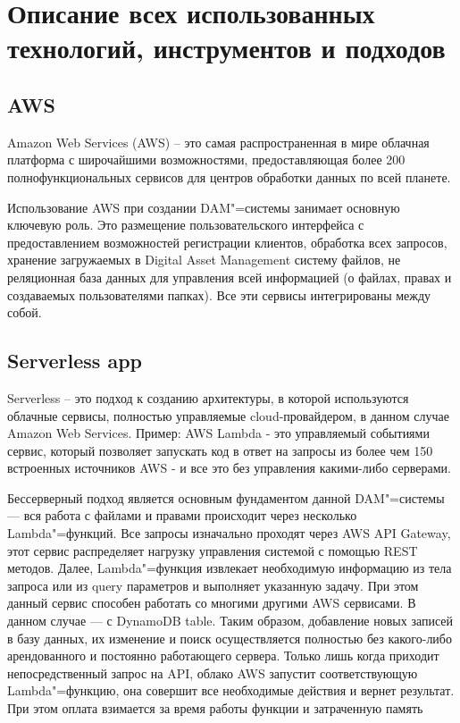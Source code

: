 
\section{Описание всех использованных технологий, инструментов и подходов}

\subsection{AWS}
Amazon Web Services (AWS) – это самая распространенная в мире облачная платформа с широчайшими возможностями, предоставляющая более 200 полнофункциональных сервисов для центров обработки данных по всей планете.

Использование AWS при создании DAM"=системы занимает основную ключевую роль. Это размещение пользовательского интерфейса с предоставлением возможностей регистрации клиентов, обработка всех запросов, хранение загружаемых в Digital Asset Management систему файлов, не реляционная база данных для управления всей информацией (о файлах, правах и создаваемых пользователями папках). Все эти сервисы интегрированы между собой.

\subsection{Serverless app}
Serverless – это подход к созданию архитектуры, в которой используются облачные сервисы, полностью управляемые cloud-провайдером, в данном случае Amazon Web Services. 
 Пример: AWS Lambda - это управляемый событиями сервис, который позволяет запускать код в ответ на запросы из более чем 150 встроенных источников AWS - и все это без управления какими-либо серверами.

Бессерверный подход является основным фундаментом данной DAM"=системы --- вся работа с файлами и правами происходит через несколько Lambda"=функций.
Все запросы изначально проходят через AWS API Gateway, этот сервис распределяет нагрузку управления системой с помощью REST методов.
Далее, Lambda"=функция извлекает необходимую информацию из тела запроса или из query параметров и выполняет указанную задачу.
При этом данный сервис способен работать со многими другими AWS сервисами. В данном случае --- с DynamoDB table.
Таким образом, добавление новых записей в базу данных, их изменение и поиск осуществляется полностью без какого-либо арендованного и постоянно работающего сервера.
Только лишь когда приходит непосредственный запрос на API, облако AWS запустит соответствующую Lambda"=функцию, она совершит все необходимые действия и вернет результат.
При этом оплата взимается за время работы функции и затраченную память

